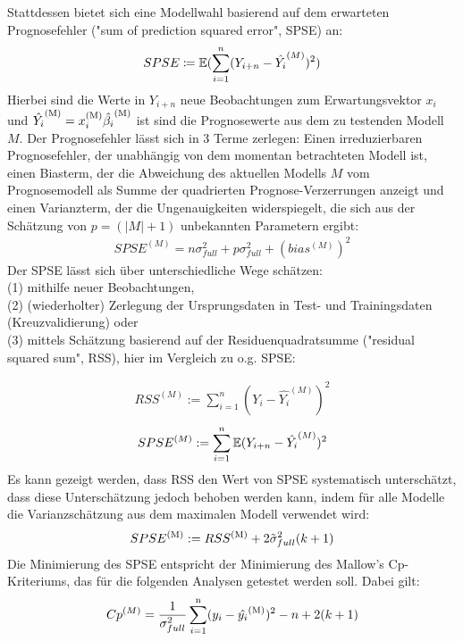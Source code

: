 	Stattdessen bietet sich eine Modellwahl basierend auf dem erwarteten Prognosefehler ("sum of prediction squared error", SPSE) an:
	\begin{align*}
		SPSE \coloneqq \operatorname{\mathbb{E}}(\sum_{i=1}^{n} (Y_{i+n} - \hat{Y_i}^{(M)})^2)
	\end{align*}
	Hierbei sind die Werte in $Y_{i+n}$ neue Beobachtungen zum Erwartungsvektor $x_i$ und $\hat{Y_i}^{\mathrm{(M)}}  = x_{i}^{\mathrm{(M)}}\hat{\beta_i}^{\mathrm{(M)}}$ ist sind die Prognosewerte aus dem zu testenden Modell $M$.
	Der Prognosefehler lässt sich in 3 Terme zerlegen: Einen irreduzierbaren Prognosefehler, der unabhängig von dem momentan betrachteten Modell ist, einen Biasterm, der die Abweichung des aktuellen Modells $M$ vom Prognosemodell als Summe der quadrierten Prognose-Verzerrungen anzeigt und einen Varianzterm, der die Ungenauigkeiten widerspiegelt, die sich aus der Schätzung von $p = (|M|+1)$ unbekannten Parametern ergibt:
	\begin{align*}
		SPSE^{(M)} = n\sigma_{full}^2 + p\sigma_{full}^2 + (bias^{(M)})^2
	\end{align*}
	Der SPSE lässt sich über unterschiedliche Wege schätzen: \\(1) mithilfe neuer Beobachtungen, \\(2) (wiederholter) Zerlegung der Ursprungsdaten in Test- und Trainingsdaten (Kreuzvalidierung)  oder \\(3) mittels Schätzung basierend auf der Residuenquadratsumme ("residual squared sum", RSS), hier im Vergleich zu o.g. SPSE:

	\begin{align*}
	RSS^{(M)} := \sum_{i=1}^{n} (Y_{i} - \hat{Y_i}^{(M)})^2
	\end{align*}
	\begin{align*}
	SPSE^{(M)} := \sum_{i=1}^{n} \operatorname{\mathbb{E}} (Y_{i+n} - \hat{Y_i}^{(M)})^2
	\end{align*}
	Es kann gezeigt werden, dass RSS den Wert von SPSE systematisch unterschätzt, dass diese Unterschätzung jedoch behoben werden kann, indem für alle Modelle die Varianzschätzung aus dem maximalen Modell verwendet wird\cite{Schumacher.2019}:
	\begin{equation}\label{eq:spse_true}
	SPSE^{\mathrm{(M)}} := RSS^{\mathrm{(M)}} + 2 \tilde{\sigma}_{full} ^2 (k+1)
	\end{equation}
	Die Minimierung des SPSE entspricht der Minimierung des Mallow's Cp- Kriteriums, das für die folgenden Analysen getestet werden soll. Dabei gilt:
	\begin{align*}
	Cp^{(M)} = \frac{1}{\sigma_{full}^2} \sum_{i=1}^{\mathrm{n}} (y_i - \hat{y_i}^{\mathrm{(M)}})^2 - n + 2(k+1)
	\end{align*}



